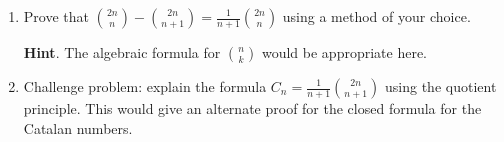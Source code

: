 \documentclass{book}
\begin{document}
\setcounter{cpjt}{183}
\addtocounter{cpjt}{-1}
\begin{activity}\label{activity-176}
\leavevmode%
\begin{enumerate}[font=\bfseries,label=(\alph*),ref=\alph*]
\item\label{task-195} \hypertarget{p-1036}{}%
Prove that \(\binom{2n}{n} - \binom{2n}{n+1} = \frac{1}{n+1}\binom{2n}{n}\) using a method of your choice.%
\par\smallskip%
\noindent\textbf{Hint}.\hypertarget{hint-124}{}\quad%
\hypertarget{p-1037}{}%
The algebraic formula for \(\binom{n}{k}\) would be appropriate here.%
\item\label{task-196} \hypertarget{p-1038}{}%
Challenge problem: explain the formula \(C_n = \frac{1}{n+1}\binom{2n}{n+1}\) using the quotient principle.  This would give an alternate proof for the closed formula for the Catalan numbers.%
\end{enumerate}
\end{activity}

\clearpage
\end{document}
